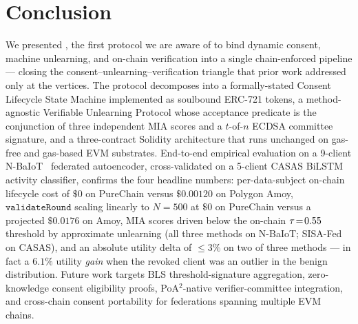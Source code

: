 \section{Conclusion}
\label{sec:conclusion}

We presented \sysname, the first protocol we are aware of to bind
dynamic consent, machine unlearning, and on-chain verification into
a single chain-enforced pipeline --- closing the
consent--unlearning--verification triangle that prior work
addressed only at the vertices. The protocol decomposes into a
formally-stated Consent Lifecycle State Machine implemented as
soulbound ERC-721 tokens, a method-agnostic Verifiable Unlearning
Protocol whose acceptance predicate is the conjunction of three
independent MIA scores and a $t$-of-$n$ ECDSA committee signature,
and a three-contract Solidity architecture that runs unchanged on
gas-free and gas-based EVM substrates. End-to-end empirical
evaluation on a 9-client N-BaIoT~\cite{meidan2018nbaiot} federated
autoencoder, cross-validated on a 5-client CASAS BiLSTM activity
classifier, confirms the four headline numbers: per-data-subject
on-chain lifecycle cost of $\$0$ on PureChain versus $\$0.00120$ on
Polygon Amoy, $\texttt{validateRound}$ scaling linearly to
$N\!=\!500$ at $\$0$ on PureChain versus a projected $\$0.0176$ on
Amoy, MIA scores driven below the on-chain $\tau\!=\!0.55$
threshold by approximate unlearning (all three methods on N-BaIoT;
SISA-Fed on CASAS), and an absolute utility delta of $\le\!3\%$ on
two of three methods --- in fact a $6.1\%$ utility \emph{gain} when
the revoked client was an outlier in the benign distribution. Future work targets BLS
threshold-signature aggregation, zero-knowledge consent eligibility
proofs, PoA$^2$-native verifier-committee integration, and
cross-chain consent portability for federations spanning multiple
EVM chains.

